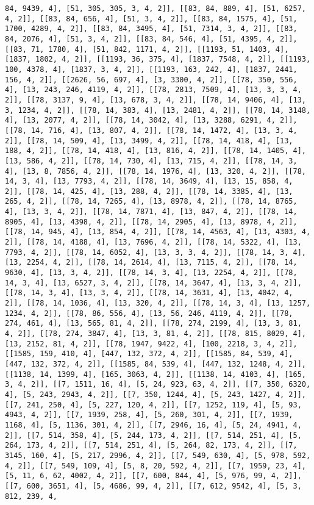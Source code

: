\documentclass[12pt,fleqn]{article}\usepackage{../../common}
\begin{document}
\begin{verbatim}
84, 9439, 4], [51, 305, 305, 3, 4, 2]], [[83, 84, 889, 4], [51, 6257, 4, 2]], [[83, 84, 656, 4], [51, 3, 4, 2]], [[83, 84, 1575, 4], [51, 1700, 4289, 4, 2]], [[83, 84, 3495, 4], [51, 7314, 3, 4, 2]], [[83, 84, 2076, 4], [51, 3, 4, 2]], [[83, 84, 546, 4], [51, 4395, 4, 2]], [[83, 71, 1780, 4], [51, 842, 1171, 4, 2]], [[1193, 51, 1403, 4], [1837, 1802, 4, 2]], [[1193, 36, 375, 4], [1837, 7548, 4, 2]], [[1193, 100, 4378, 4], [1837, 3, 4, 2]], [[1193, 163, 242, 4], [1837, 2441, 156, 4, 2]], [[2626, 56, 697, 4], [3, 3300, 4, 2]], [[78, 350, 556, 4], [13, 243, 246, 4119, 4, 2]], [[78, 2813, 7509, 4], [13, 3, 3, 4, 2]], [[78, 3137, 9, 4], [13, 678, 3, 4, 2]], [[78, 14, 9406, 4], [13, 3, 1234, 4, 2]], [[78, 14, 383, 4], [13, 2481, 4, 2]], [[78, 14, 3148, 4], [13, 2077, 4, 2]], [[78, 14, 3042, 4], [13, 3288, 6291, 4, 2]], [[78, 14, 716, 4], [13, 807, 4, 2]], [[78, 14, 1472, 4], [13, 3, 4, 2]], [[78, 14, 509, 4], [13, 3499, 4, 2]], [[78, 14, 418, 4], [13, 188, 4, 2]], [[78, 14, 418, 4], [13, 816, 4, 2]], [[78, 14, 1405, 4], [13, 586, 4, 2]], [[78, 14, 730, 4], [13, 715, 4, 2]], [[78, 14, 3, 4], [13, 8, 7856, 4, 2]], [[78, 14, 1976, 4], [13, 320, 4, 2]], [[78, 14, 3, 4], [13, 7793, 4, 2]], [[78, 14, 3649, 4], [13, 15, 858, 4, 2]], [[78, 14, 425, 4], [13, 288, 4, 2]], [[78, 14, 3385, 4], [13, 265, 4, 2]], [[78, 14, 7265, 4], [13, 8978, 4, 2]], [[78, 14, 8765, 4], [13, 3, 4, 2]], [[78, 14, 7871, 4], [13, 847, 4, 2]], [[78, 14, 8905, 4], [13, 4398, 4, 2]], [[78, 14, 2905, 4], [13, 8978, 4, 2]], [[78, 14, 945, 4], [13, 854, 4, 2]], [[78, 14, 4563, 4], [13, 4303, 4, 2]], [[78, 14, 4188, 4], [13, 7696, 4, 2]], [[78, 14, 5322, 4], [13, 7793, 4, 2]], [[78, 14, 6052, 4], [13, 3, 3, 4, 2]], [[78, 14, 3, 4], [13, 2254, 4, 2]], [[78, 14, 2614, 4], [13, 7115, 4, 2]], [[78, 14, 9630, 4], [13, 3, 4, 2]], [[78, 14, 3, 4], [13, 2254, 4, 2]], [[78, 14, 3, 4], [13, 6527, 3, 4, 2]], [[78, 14, 3647, 4], [13, 3, 4, 2]], [[78, 14, 3, 4], [13, 3, 4, 2]], [[78, 14, 3631, 4], [13, 4042, 4, 2]], [[78, 14, 1036, 4], [13, 320, 4, 2]], [[78, 14, 3, 4], [13, 1257, 1234, 4, 2]], [[78, 86, 556, 4], [13, 56, 246, 4119, 4, 2]], [[78, 274, 461, 4], [13, 565, 81, 4, 2]], [[78, 274, 2199, 4], [13, 3, 81, 4, 2]], [[78, 274, 3847, 4], [13, 3, 81, 4, 2]], [[78, 815, 8029, 4], [13, 2152, 81, 4, 2]], [[78, 1947, 9422, 4], [100, 2218, 3, 4, 2]], [[1585, 159, 410, 4], [447, 132, 372, 4, 2]], [[1585, 84, 539, 4], [447, 132, 372, 4, 2]], [[1585, 84, 539, 4], [447, 132, 1248, 4, 2]], [[1138, 14, 1399, 4], [165, 3063, 4, 2]], [[1138, 14, 4103, 4], [165, 3, 4, 2]], [[7, 1511, 16, 4], [5, 24, 923, 63, 4, 2]], [[7, 350, 6320, 4], [5, 243, 2943, 4, 2]], [[7, 350, 1244, 4], [5, 243, 1427, 4, 2]], [[7, 241, 250, 4], [5, 227, 120, 4, 2]], [[7, 1252, 119, 4], [5, 93, 4943, 4, 2]], [[7, 1939, 258, 4], [5, 260, 301, 4, 2]], [[7, 1939, 1168, 4], [5, 1136, 301, 4, 2]], [[7, 2946, 16, 4], [5, 24, 4941, 4, 2]], [[7, 514, 358, 4], [5, 244, 173, 4, 2]], [[7, 514, 251, 4], [5, 264, 173, 4, 2]], [[7, 514, 251, 4], [5, 264, 82, 173, 4, 2]], [[7, 3145, 160, 4], [5, 217, 2996, 4, 2]], [[7, 549, 630, 4], [5, 978, 592, 4, 2]], [[7, 549, 109, 4], [5, 8, 20, 592, 4, 2]], [[7, 1959, 23, 4], [5, 11, 6, 62, 4002, 4, 2]], [[7, 600, 844, 4], [5, 976, 99, 4, 2]], [[7, 600, 3651, 4], [5, 4686, 99, 4, 2]], [[7, 612, 9542, 4], [5, 3, 812, 239, 4, 
\end{verbatim}
\end{document}
